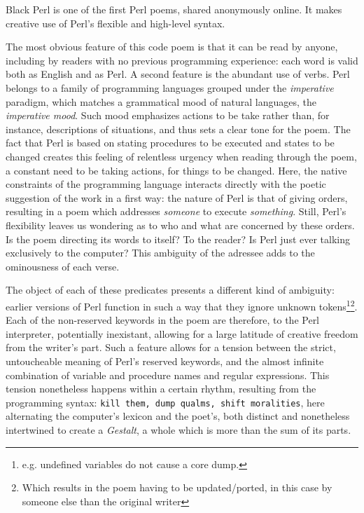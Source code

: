 \begin{listing}
  \inputminted{perl}{./corpus/black_perl.pl}
  \caption{Black Perl is one of the first Perl poems, shared anonymously online. It makes creative use of Perl's flexible and high-level syntax.}
  \label{code:black_perl}
\end{listing}

The most obvious feature of this code poem is that it can be read by anyone, including by readers with no previous programming experience: each word is valid both as English and as Perl. A second feature is the abundant use of verbs. Perl belongs to a family of programming languages grouped under the \emph{imperative} paradigm, which matches a grammatical mood of natural languages, the \emph{imperative mood}. Such mood emphasizes actions to be take rather than, for instance, descriptions of situations, and thus sets a clear tone for the poem. The fact that Perl is based on stating procedures to be executed and states to be changed creates this feeling of relentless urgency when reading through the poem, a constant need to be taking actions, for things to be changed. Here, the native constraints of the programming language interacts directly with the poetic suggestion of the work in a first way: the nature of Perl is that of giving orders, resulting in a poem which addresses \emph{someone} to execute \emph{something}. Still, Perl's flexibility leaves us wondering as to who and what are concerned by these orders. Is the poem directing its words to itself? To the reader? Is Perl just ever talking exclusively to the computer? This ambiguity of the adressee adds to the ominousness of each verse.

The object of each of these predicates presents a different kind of ambiguity: earlier versions of Perl function in such a way that they ignore unknown tokens\footnote{e.g. undefined variables do not cause a core dump.}\footnote{Which results in the poem having to be updated/ported, in this case by someone else than the original writer}. Each of the non-reserved keywords in the poem are therefore, to the Perl interpreter, potentially inexistant, allowing for a large latitude of creative freedom from the writer's part. Such a feature allows for a tension between the strict, untoucheable meaning of Perl's reserved keywords, and the almost infinite combination of variable and procedure names and regular expressions. This tension nonetheless happens within a certain rhythm, resulting from the programming syntax: \lstinline{kill them, dump qualms, shift moralities}, here alternating the computer's lexicon and the poet's, both distinct and nonetheless intertwined to create a \emph{Gestalt}, a whole which is more than the sum of its parts.

